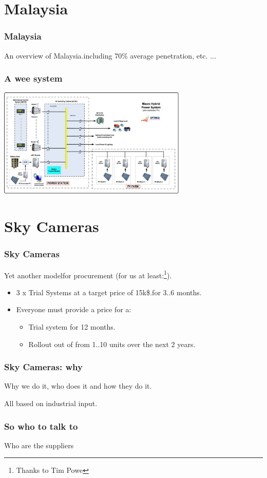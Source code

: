 \documentclass{beamer}
\begin{document}
\section{Malaysia}
\begin{frame}\frametitle{Malaysia}
An overview of Malaysia.including 70\% average penetration, etc. ...
\end{frame}

\begin{frame}\frametitle{A wee system}
\includegraphics[width=9cm]{optimal_power_macro_hybrid_mini_grid_line_diagram_ops.png}
\end{frame}

\section{Sky Cameras}

\begin{frame}\frametitle{Sky Cameras}
Yet another modelfor procurement (for us at least:\footnote{Thanks to
  Tim Powe}).
  \begin{itemize}
  \item 3 x Trial Systems at a target price of 15k\$.for 3..6 months.
    \pause
  \item Everyone must provide a price for a:
    \begin{itemize}
    \item Trial system for 12 months.
    \item Rollout out of from 1..10 units over the next 2 years.
    \end{itemize}
  \end{itemize}
\end{frame}

\begin{frame}\frametitle{Sky Cameras: why}
Why we do it, who does it and how they do it.

All based on industrial input.
\end{frame}

\begin{frame}\frametitle{So who to talk to}
Who are the suppliers
\end{frame}
\end{document}
